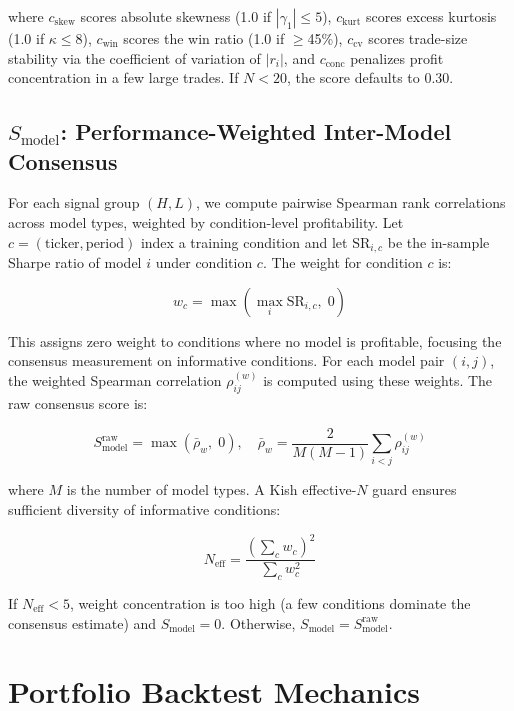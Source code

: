 \documentclass[12pt,a4paper]{article}
\begin{document}
where $c_{\text{skew}}$ scores absolute skewness (1.0 if $|\gamma_1| \leq 5$), $c_{\text{kurt}}$ scores excess kurtosis (1.0 if $\kappa \leq 8$), $c_{\text{win}}$ scores the win ratio (1.0 if $\geq$45\%), $c_{\text{cv}}$ scores trade-size stability via the coefficient of variation of $|r_i|$, and $c_{\text{conc}}$ penalizes profit concentration in a few large trades. If $N < 20$, the score defaults to 0.30.

\subsection*{$S_{\text{model}}$: Performance-Weighted Inter-Model Consensus}

For each signal group $(H, L)$, we compute pairwise Spearman rank correlations across model types, weighted by condition-level profitability. Let $c = (\text{ticker}, \text{period})$ index a training condition and let $\text{SR}_{i,c}$ be the in-sample Sharpe ratio of model $i$ under condition $c$. The weight for condition $c$ is:

\begin{equation}
  w_c = \max\!\left(\max_i \text{SR}_{i,c},\; 0\right)
\end{equation}

This assigns zero weight to conditions where no model is profitable, focusing the consensus measurement on informative conditions. For each model pair $(i, j)$, the weighted Spearman correlation $\rho_{ij}^{(w)}$ is computed using these weights. The raw consensus score is:

\begin{equation}
  S_{\text{model}}^{\text{raw}} = \max\!\left(\bar{\rho}_w,\; 0\right), \quad \bar{\rho}_w = \frac{2}{M(M-1)} \sum_{i < j} \rho_{ij}^{(w)}
\end{equation}

where $M$ is the number of model types. A Kish effective-$N$ guard \citep{kish1965survey} ensures sufficient diversity of informative conditions:

\begin{equation}
  N_{\text{eff}} = \frac{\left(\sum_c w_c\right)^2}{\sum_c w_c^2}
\end{equation}

If $N_{\text{eff}} < 5$, weight concentration is too high (a few conditions dominate the consensus estimate) and $S_{\text{model}} = 0$. Otherwise, $S_{\text{model}} = S_{\text{model}}^{\text{raw}}$.


\section{Portfolio Backtest Mechanics}
\label{app:backtest}
\end{document}
